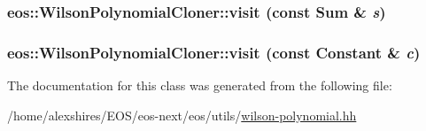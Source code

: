 \label{classeos_1_1WilsonPolynomialCloner_a8bc46349f3e4d3329ab1cec99c4772a6}
\hypertarget{classeos_1_1WilsonPolynomialCloner_a17806441fa08134c7af096d4688499ab}{
\subsubsection[{visit}]{ eos::WilsonPolynomialCloner::visit (const Sum \& {\em s})}}
\label{classeos_1_1WilsonPolynomialCloner_a17806441fa08134c7af096d4688499ab}
\hypertarget{classeos_1_1WilsonPolynomialCloner_a636e34f10bcf08e04d7e7afea3c0366c}{
\subsubsection[{visit}]{ eos::WilsonPolynomialCloner::visit (const Constant \& {\em c})}}
\label{classeos_1_1WilsonPolynomialCloner_a636e34f10bcf08e04d7e7afea3c0366c}


The documentation for this class was generated from the following file:\begin{DoxyCompactItemize}
\item 
/home/alexshires/EOS/eos-\/next/eos/utils/\hyperlink{wilson-polynomial_8hh}{wilson-\/polynomial.hh}\end{DoxyCompactItemize}
